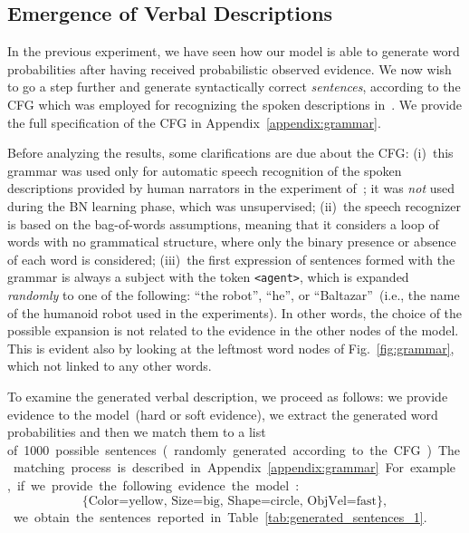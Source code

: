 \subsection{Emergence of Verbal Descriptions}

In the previous experiment, we have seen how our model is able to generate word probabilities after having received probabilistic observed evidence.
We now wish to go a step further and generate syntactically correct \emph{sentences}, according to the \ac{CFG} which was employed for recognizing the spoken descriptions in~\cite{salvi:2012:smcb}.
We provide the full specification of the \acf{CFG} in Appendix~\ref{appendix:grammar}.

Before analyzing the results, some clarifications are due about the \ac{CFG}:
(i)~this grammar was used only for automatic speech recognition of the spoken descriptions provided by human narrators in the experiment of~\cite{salvi:2012:smcb}; it was \emph{not} used during the \AffWords{} \ac{BN} learning phase, which was unsupervised;
(ii)~the speech recognizer is based on the bag-of-words assumptions, meaning that it considers a loop of words with no grammatical structure, where only the binary presence or absence of each word is considered;
(iii)~the first expression of sentences formed with the grammar is always a subject with the token \verb!<agent>!, which is expanded \emph{randomly} to one of the following: ``the robot'', ``he'', or ``Baltazar''~(i.e., the name of the humanoid robot used in the experiments). In other words, the choice of the possible expansion is not related to the evidence in the other nodes of the model. This is evident also by looking at the leftmost word nodes of Fig.~\ref{fig:grammar}, which not linked to any other words.

To examine the generated verbal description, we proceed as follows: we provide evidence to the model~(hard or soft evidence), we extract the generated word probabilities and then we match them to a list of~\SI{1000} possible sentences~(randomly generated according to the \ac{CFG}).
The matching process is described in Appendix~\ref{appendix:grammar}.

For example, if we provide the following evidence the model:
\begin{equation*}
\{\text{Color=yellow, Size=big, Shape=circle, ObjVel=fast}\},
\end{equation*}
we obtain the sentences reported in Table~\ref{tab:generated_sentences_1}.

